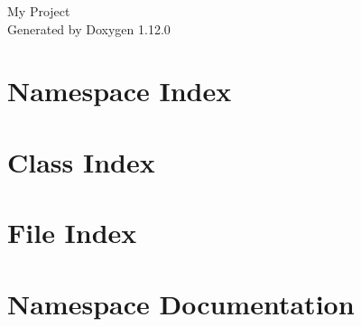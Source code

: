 \documentclass[twoside]{book}
\newcommand{\+}{\discretionary{\mbox{\scriptsize$\hookleftarrow$}}{}{}}
\newcommand{\clearemptydoublepage}{%
    \newpage{\pagestyle{empty}\cleardoublepage}%
  }
\begin{document}
  \raggedbottom
    \hypersetup{pageanchor=false,
                bookmarksnumbered=true,
                pdfencoding=unicode
               }
  \begin{titlepage}
  \vspace*{7cm}
  \begin{center}%
  {\Large My Project}\\
  \vspace*{1cm}
  {\large Generated by Doxygen 1.12.0}\\
  \end{center}
  \end{titlepage}
  \clearemptydoublepage
  \tableofcontents
  \clearemptydoublepage
  \hypersetup{pageanchor=true}
\chapter{Namespace Index}

\chapter{Class Index}

\chapter{File Index}

\chapter{Namespace Documentation}

\end{document}
